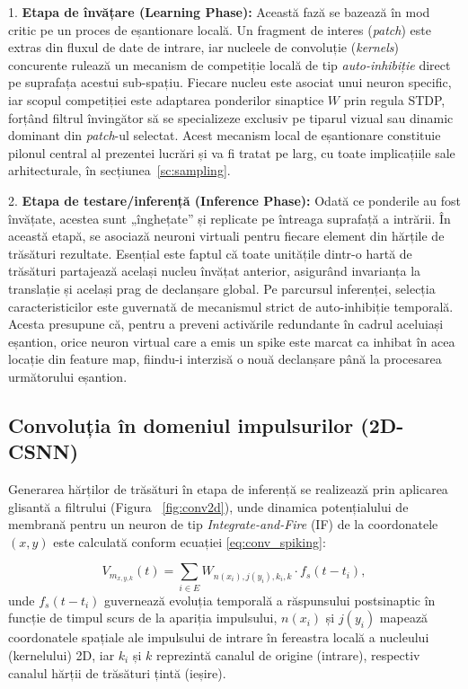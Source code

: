 1. \textbf{Etapa de învățare (Learning Phase):} Această fază se bazează în mod critic pe un proces de eșantionare locală. Un fragment de interes (\textit{patch}) este extras din fluxul de date de intrare, iar nucleele de convoluție (\textit{kernels}) concurente rulează un mecanism de competiție locală de tip \textit{auto-inhibiție} direct pe suprafața acestui sub-spațiu. Fiecare nucleu este asociat unui neuron specific, iar scopul competiției este adaptarea ponderilor sinaptice $W$ prin regula STDP, forțând filtrul învingător să se specializeze exclusiv pe tiparul vizual sau dinamic dominant din \textit{patch}-ul selectat. Acest mecanism local de eșantionare constituie pilonul central al prezentei lucrări și va fi tratat pe larg, cu toate implicațiile sale arhitecturale, în secțiunea~\ref{sc:sampling}.

2. \textbf{Etapa de testare/inferență (Inference Phase):} Odată ce ponderile au fost învățate, acestea sunt „înghețate” și replicate pe întreaga suprafață a intrării. În această etapă, se asociază neuroni virtuali pentru fiecare element din hărțile de trăsături rezultate. Esențial este faptul că toate unitățile dintr-o hartă de trăsături partajează același nucleu învățat anterior, asigurând invarianța la translație și același prag de declanșare global. Pe parcursul inferenței, selecția caracteristicilor este guvernată de mecanismul strict de auto-inhibiție temporală. Acesta presupune că, pentru a preveni activările redundante în cadrul aceluiași eșantion, orice neuron virtual care a emis un spike este marcat ca inhibat în acea locație din feature map, fiindu-i interzisă o nouă declanșare până la procesarea următorului eșantion.

\subsection*{Convoluția în domeniul impulsurilor (2D-CSNN)}

Generarea hărților de trăsături în etapa de inferență se realizează prin aplicarea glisantă a filtrului (Figura ~\ref{fig:conv2d}), unde dinamica potențialului de membrană pentru un neuron de tip \textit{Integrate-and-Fire} (IF) de la coordonatele $(x, y)$ este calculată conform ecuației \eqref{eq:conv_spiking}:

\begin{equation}
\label{eq:conv_spiking}
V_{m_{x,y,k}}(t) = \sum_{i \in E} W_{n(x_i), j(y_i), k_i, k} \cdot f_s(t - t_i),
\end{equation}
unde $f_s(t - t_i)$ guvernează evoluția temporală a răspunsului postsinaptic în funcție de timpul scurs de la apariția impulsului, $n(x_i)$ și $j(y_i)$ mapează coordonatele spațiale ale impulsului de intrare în fereastra locală a nucleului (kernelului) 2D, iar $k_i$ și $k$ reprezintă canalul de origine (intrare), respectiv canalul hărții de trăsături țintă (ieșire).

